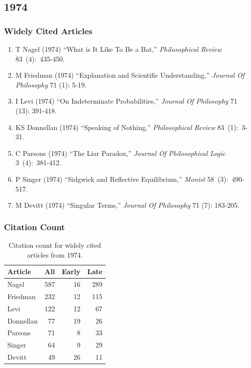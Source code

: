 \documentclass[
  10pt,
  letterpaper,
  DIV=11,
  numbers=noendperiod,
  twoside]{scrartcl}
\providecommand{\tightlist}{%
  \setlength{\itemsep}{0pt}\setlength{\parskip}{0pt}}\usepackage{longtable,booktabs,array}
\begin{document}
\newpage

\subsection{1974}\label{sec-s1974}

\subsubsection*{Widely Cited Articles}\label{widely-cited-articles-17}

\begin{enumerate}
\def\labelenumi{\arabic{enumi}.}
\tightlist
\item
  T Nagel (1974) ``What is It Like To Be a Bat,'' \emph{Philosophical
  Review} 83~(4):~435-450.
\item
  M Friedman (1974) ``Explanation and Scientific Understanding,''
  \emph{Journal Of Philosophy} 71 (1): 5-19.
\item
  I Levi (1974) ``On Indeterminate Probabilities,'' \emph{Journal Of
  Philosophy} 71 (13): 391-418.
\item
  KS Donnellan (1974) ``Speaking of Nothing,'' \emph{Philosophical
  Review} 83~(1):~3-31.
\item
  C Parsons (1974) ``The Liar Paradox,'' \emph{Journal Of Philosophical
  Logic} 3~(4):~381-412.
\item
  P Singer (1974) ``Sidgwick and Reflective Equilibrium,'' \emph{Monist}
  58~(3):~490-517.
\item
  M Devitt (1974) ``Singular Terms,'' \emph{Journal Of Philosophy} 71
  (7): 183-205.
\end{enumerate}

\subsubsection*{Citation Count}\label{sec-count-1974}

\begin{longtable}[]{@{}lrrr@{}}

\caption{\label{tbl-citation-count-1974}Citation count for widely cited
articles from 1974.}

\tabularnewline

\toprule\noalign{}
Article & All & Early & Late \\
\midrule\noalign{}
\endhead
\bottomrule\noalign{}
\endlastfoot
Nagel & 587 & 16 & 289 \\
Friedman & 232 & 12 & 115 \\
Levi & 122 & 12 & 67 \\
Donnellan & 77 & 19 & 26 \\
Parsons & 71 & 8 & 33 \\
Singer & 64 & 9 & 29 \\
Devitt & 49 & 26 & 11 \\

\end{longtable}
\end{document}
